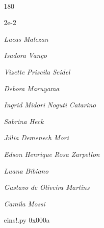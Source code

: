 \documentclass[12pt]{article}
\begin{document}
	\hfill	  	  


\pagebreak			

	\ 
	\vfill
	\begin{turn}{180}	
		\begin{minipage}{\textwidth}
		  	\ttfamily %
			\centering
			{\Huge 2e-2}
		  
			\hfill
		  
			

\textit{\small Lucas Malezan}

\textit{\small Isadora Vanço}

\textit{\small Vizette Priscila Seidel}

\textit{\small Debora Maruyama}

\textit{\small Ingrid Midori Noguti Catarino}

\textit{\small Sabrina Heck}

\textit{\small Júlia Demenech Mori}

\textit{\small Edson Henrique Rosa Zarpellon}

\textit{\small Luana Bibiano}

\textit{\small Gustavo de Oliveira Martins}

\textit{\small Camila Mossi}

\bigskip

eins!.py
0x000a


		\end{minipage}	
	\end{turn}
	\vfill
	\

\pagebreak
\end{document}
